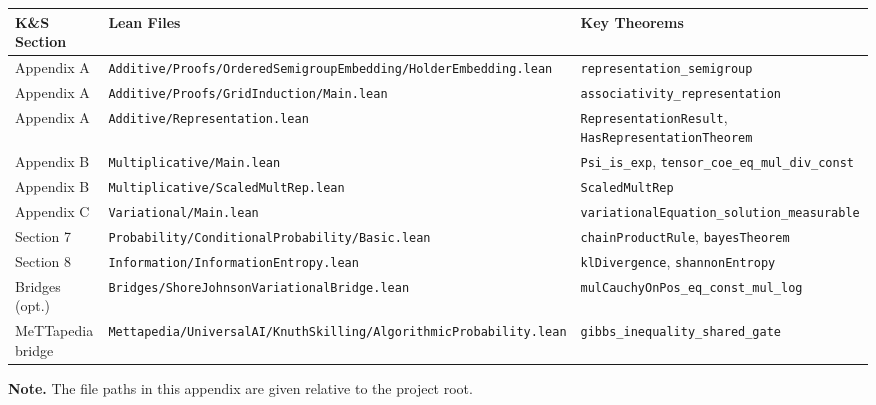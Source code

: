 \documentclass[11pt]{article}
\begin{document}
\footnotesize
\begin{longtable}{p{2.2cm}p{8.0cm}p{4.3cm}}
\toprule
\textbf{K\&S Section} & \textbf{Lean Files} & \textbf{Key Theorems} \\
\midrule
\endhead
Appendix A & \nolinkurl{Additive/Proofs/OrderedSemigroupEmbedding/HolderEmbedding.lean} & \nolinkurl{representation_semigroup} \\
Appendix A & \nolinkurl{Additive/Proofs/GridInduction/Main.lean} & \nolinkurl{associativity_representation} \\
Appendix A & \nolinkurl{Additive/Representation.lean} & \nolinkurl{RepresentationResult}, \nolinkurl{HasRepresentationTheorem} \\
Appendix B & \nolinkurl{Multiplicative/Main.lean} & \nolinkurl{Psi_is_exp}, \nolinkurl{tensor_coe_eq_mul_div_const} \\
Appendix B & \nolinkurl{Multiplicative/ScaledMultRep.lean} & \nolinkurl{ScaledMultRep} \\
Appendix C & \nolinkurl{Variational/Main.lean} & \nolinkurl{variationalEquation_solution_measurable} \\
Section 7 & \nolinkurl{Probability/ConditionalProbability/Basic.lean} & \nolinkurl{chainProductRule}, \nolinkurl{bayesTheorem} \\
Section 8 & \nolinkurl{Information/InformationEntropy.lean} & \nolinkurl{klDivergence}, \nolinkurl{shannonEntropy} \\
Bridges (opt.) & \nolinkurl{Bridges/ShoreJohnsonVariationalBridge.lean} & \nolinkurl{mulCauchyOnPos_eq_const_mul_log} \\
MeTTapedia bridge & \nolinkurl{Mettapedia/UniversalAI/KnuthSkilling/AlgorithmicProbability.lean} & \nolinkurl{gibbs_inequality_shared_gate} \\
\bottomrule
\end{longtable}

\noindent\textbf{Note.} The file paths in this appendix are given relative to the project root.
\end{document}

